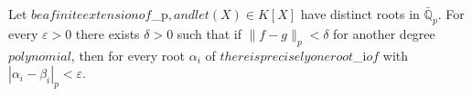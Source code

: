 Let $ be a finite extension of $_p$, and let (X) \in K[X]$ have distinct roots in $\bar{\mathbb{Q}}_p$. For every $\varepsilon > 0$ there exists $\delta > 0$ such that if $\|f-g\|_p < \delta$ for another degree $ polynomial $, then for every root $\alpha_i$ of $ there is precisely one root $\beta_i$ of $ with $|\alpha_i - \beta_i|_p < \varepsilon$.
